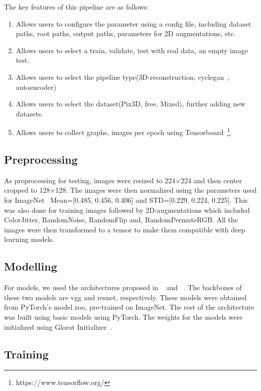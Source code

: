 The key features of this pipeline are as follows:
\begin{enumerate}
    \item Allows users to configure the parameter using a config file, including dataset paths, root paths, output paths, parameters for 2D augmentations, etc.
    \item Allows users to select a train, validate, test with real data, an empty image test.
    \item Allows users to select the pipeline type(3D-reconstruction, cyclegan~\cite{CycleGAN2017}, autoencoder)
    \item Allows users to select the dataset(Pix3D, \gls{free}, Mixed), further adding new datasets.
    \item Allows users to collect graphs, images per epoch using Tensorboard~\footnote{https://www.tensorflow.org/}.
\end{enumerate}

\subsection{Preprocessing}\label{subsec:preprocessing}
As preprocessing for testing, images were resized to 224$\times$224 and then center cropped to 128$\times$128.
The images were then normalized using the parameters used for ImageNet~\cite{Deng2009ImageNetAL} Mean=[0.485, 0.456, 0.406] and STD=[0.229, 0.224, 0.225].
This was also done for training images followed by 2D-augmentations which included ColorJitter, RandomNoise, RandomFlip and, RandomPermuteRGB\@.
All the images were then transformed to a tensor to make them compatible with deep learning models.

\subsection{Modelling}\label{subsec:modelling}
For models, we used the architectures proposed in ~\cite{Xie_2019} and ~\cite{Xie_2020}.
The backbones of these two models are \gls{vgg} and \gls{resnet}, respectively.
These models were obtained from PyTorch's model zoo, pre-trained on ImageNet.
The rest of the architecture was built using basic models using PyTorch.
The weights for the models were initialized using Glorot Initializer~\cite{Glorot2010UnderstandingTD}.

\subsection{Training}\label{subsec:training}

